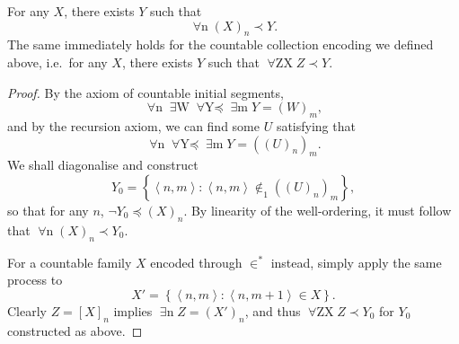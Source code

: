 \documentclass[12pt,openany]{book}
\theoremstyle{plain}
\theoremstyle{definition}
\newcommand\tuple[1]{\left\langle #1 \right\rangle}
\newcommand\opA[1]{\mathop{\forall #1}}
\newcommand\opE[1]{\mathop{\exists #1}}
\newcommand\CM{\mathrm{CM}}
\newcommand\GWO{\mathrm{GWO}}
\begin{document}
\begin{lemma}[$\CM + \GWO$]
  \label{lem:cm-gwo-countable-family-bound}
  For any $X$, there exists $Y$ such that
  \[\opA{n} \left(X\right)_n \prec Y.\]
  The same immediately holds for the countable collection encoding we defined above, i.e.\ for any $X$, there exists $Y$ such that $\opA{Z \in^* X} Z \prec Y$.
\end{lemma}

\begin{proof}
  By the axiom of countable initial segments,
  \[\opA{n} \opE{W} \opA{Y \preceq \left(X\right)_n} \opE{m} Y = \left(W\right)_m,\]
  and by the recursion axiom, we can find some $U$ satisfying that
  \[\opA{n} \opA{Y \preceq \left(X\right)_n} \opE{m} Y = \left(\left(U\right)_n\right)_m.\]
  We shall diagonalise and construct
  \[Y_0 = \left\{\tuple{n, m} : \tuple{n, m} \not\in_1 \left(\left(U\right)_n\right)_m\right\},\]
  so that for any $n$, $\neg Y_0 \preceq \left(X\right)_n$. By linearity of the well-ordering, it must follow that $\opA{n} \left(X\right)_n \prec Y_0$.

  For a countable family $X$ encoded through $\in^*$ instead, simply apply the same process to
  \[X' = \left\{\tuple{n, m} : \tuple{n, m + 1} \in X\right\}.\]
  Clearly $Z = \left[X\right]_n$ implies $\opE{n} Z = \left(X'\right)_n$, and thus $\opA{Z \in^* X} Z \prec Y_0$ for $Y_0$ constructed as above.
\end{proof}
\end{document}
